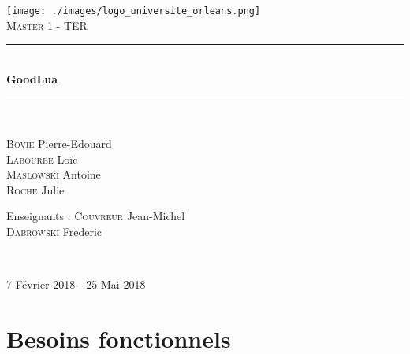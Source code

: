 \documentclass[12pt,francais]{report}
\begin{document}
\begin{center}
\texttt{[image: ./images/logo\_universite\_orleans.png]}~\\[1.5cm]

\textsc{\large Master 1 - TER}\\[1cm]	

\rule{\linewidth}{0.5mm}\\[0.4cm]

{ \LARGE \bfseries GoodLua\\[0.4cm] }

\rule{\linewidth}{0.5mm}\\[2cm]
\end{center}


\begin{minipage}{0.4\textwidth}
      \begin{flushleft}
			\textsc{Bovie} Pierre-Edouard\\
			\textsc{Labourbe} Loïc\\
			\textsc{Maslowski} Antoine\\
			\textsc{Roche} Julie\\
			\end{flushleft}
    \end{minipage}\hfill
    \begin{minipage}{0.6\textwidth}
      \begin{flushright}
			Enseignants : \textsc{Couvreur} Jean-Michel\\
			\textsc{Dabrowski} Frederic\\

\end{flushright}
    \end{minipage}\\[1.5cm]
		
		\begin{center}
    {7 Février 2018 - 25 Mai 2018}
		\end{center}

\chapter*{Besoins fonctionnels}
\end{document}
